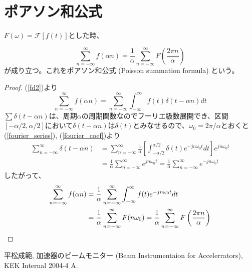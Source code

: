 \documentclass[]{jlreq}
\theoremstyle{definition}
\begin{document}
\appendix
\renewcommand{\theequation}{\Alph{section}.\arabic{equation} }
\setcounter{equation}{0}

\section{ポアソン和公式}

$F(\omega) = \mathcal{F}[f(t)]$とした時、

\begin{equation}
  \sum_{n=-\infty}^{\infty} f(\alpha n) = \frac{1}{\alpha} \sum_{n=-\infty}^{\infty} F\left( \frac{2 \pi n}{\alpha}\right)
\end{equation}
%
が成り立つ。これをポアソン和公式 (Poisson summation formula) という。
%
\begin{proof}
  (\ref{fd2})より
  \begin{equation}
    \sum_{n=-\infty}^{\infty} f(\alpha n) = \sum_{n=-\infty}^{\infty}\int_{-\infty}^{\infty} f(t) \delta(t - \alpha n) dt
  \end{equation}
  $\sum \delta(t - \alpha n)$は、周期$\alpha$の周期関数なのでフーリエ級数展開でき、区間$[-\alpha/2, \alpha/2]$において$\delta(t-\alpha n)$は$\delta(t)$とみなせるので、$\omega_0 = 2\pi/\alpha$とおくと(\ref{fourier_series}), (\ref{fourier_coef})より
  \begin{align}
    \sum_{n=-\infty}^{\infty}\delta(t - \alpha n) 
    &= \sum_{n=-\infty}^{\infty} \frac{1}{\alpha} \left[ \int_{-\alpha/2}^{\alpha/2} \delta(t) e^{-j n\omega_0 t} dt \right] e^{j n \omega_0 t} \\
    &= \frac{1}{\alpha} \sum_{n=-\infty}^{\infty} e^{j n\omega_0 t} = \frac{1}{\alpha} \sum_{n=-\infty}^{\infty} e^{-j n\omega_0 t} 
  \end{align}
  したがって、
  \begin{align}
    \sum_{n=-\infty}^{\infty} f(\alpha n) &=\frac{1}{\alpha} \sum_{n=-\infty}^{\infty} \int_{-\infty}^{\infty} f(t) e^{-j n \omega_0 t} dt \notag\\
      &= \frac{1}{\alpha} \sum_{n=-\infty}^{\infty}F(n\omega_0) 
      = \frac{1}{\alpha} \sum_{n=-\infty}^{\infty} F\left( \frac{2 \pi n}{\alpha}\right) \notag
  \end{align}
\end{proof}
%
\begin{thebibliography}{9}
  平松成範, 加速器のビームモニター (Beam Instrumentaion for Accelerrators), KEK Internal 2004-4 A.
\end{thebibliography}
%
\end{document}
